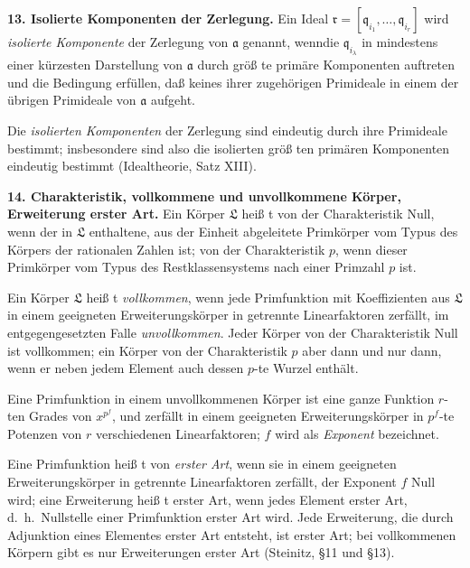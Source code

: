 \documentclass[12pt,a4paper]{article}
\begin{document}
{{\textbf{13. Isolierte Komponenten der Zerlegung.} Ein Ideal
$\mathfrak{r}=[\mathfrak{q}_{i_{1}},\dots,\mathfrak{q}_{i_{r}}]$ wird \textit{isolierte Komponente} der Zerlegung von $\mathfrak{a}$ genannt,
wenndie $\mathfrak{q}_{i_{\lambda}}$ in mindestens einer k\"{u}rzesten Darstellung von $\mathfrak{a}$ durch
gr\"{o}{\ss} te prim\"{a}re Komponenten auftreten und die Bedingung erf\"{u}llen, da{\ss{}}
keines ihrer zugeh\"{o}rigen Primideale in einem der \"{u}brigen Primideale von $\mathfrak{a}$
aufgeht.

Die \textit{isolierten Komponenten} der Zerlegung sind eindeutig durch
ihre Primideale bestimmt; insbesondere sind also die isolierten gr\"{o}{\ss} ten
prim\"{a}ren Komponenten eindeutig bestimmt (Idealtheorie, Satz XIII).

\textbf{14. Charakteristik, vollkommene und unvollkommene K\"{o}rper, Erweiterung
erster Art.} Ein K\"{o}rper $\mathfrak{L}$ hei{\ss} t von der Charakteristik Null, wenn der in
$\mathfrak{L}$ enthaltene, aus der Einheit abgeleitete Primk\"{o}rper vom Typus des K\"{o}rpers
der rationalen Zahlen ist; von der Charakteristik $p$, wenn dieser Primk\"{o}rper
vom Typus des Restklassensystems nach einer Primzahl $p$ ist.

Ein K\"{o}rper $\mathfrak{L}$ hei{\ss} t \textit{vollkommen}, wenn jede Primfunktion mit Koeffizienten
aus $\mathfrak{L}$ in einem geeigneten Erweiterungsk\"{o}rper in getrennte Linearfaktoren
zerf\"{a}llt, im entgegengesetzten Falle \textit{unvollkommen}. Jeder K\"{o}rper von
der Charakteristik Null ist vollkommen; ein K\"{o}rper von der Charakteristik
$p$ aber dann und nur dann, wenn er neben jedem Element auch dessen
$p$-te Wurzel enth\"{a}lt.

Eine Primfunktion in einem unvollkommenen K\"{o}rper ist eine ganze Funktion
$r$-ten Grades von $x^{p^{f}}$, und zerf\"{a}llt in einem geeigneten Erweiterungsk\"{o}rper
in $p^{f}$-te Potenzen von $r$ verschiedenen Linearfaktoren; $f$ wird als
\textit{Exponent} bezeichnet.

Eine Primfunktion hei{\ss} t von \textit{erster Art}, wenn sie in einem geeigneten
Erweiterungsk\"{o}rper in getrennte Linearfaktoren zerf\"{a}llt, der Exponent $f$
Null wird; eine Erweiterung hei{\ss} t erster Art, wenn jedes Element erster
Art, d.~h.~Nullstelle einer Primfunktion erster Art wird. Jede Erweiterung,
die durch Adjunktion eines Elementes erster Art entsteht, ist erster Art;
bei vollkommenen K\"{o}rpern gibt es nur Erweiterungen erster Art (Steinitz,
\S 11 und \S 13).

}}
\end{document}
